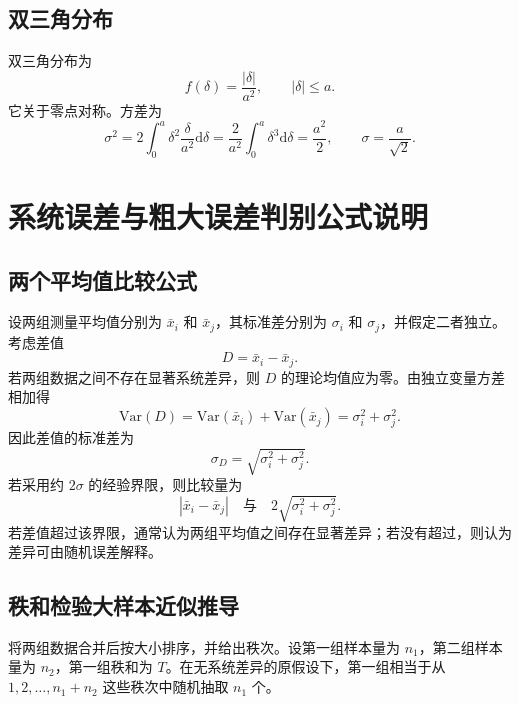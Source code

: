 \documentclass[UTF8,12pt,a4paper]{ctexart}
\newcommand{\dd}{\mathrm{d}}
\newcommand{\Var}{\mathrm{Var}}
\newcommand{\abs}[1]{\left|#1\right|}
\begin{document}
\subsection{双三角分布}
双三角分布为
\begin{equation*}
f(\delta)=\frac{\abs{\delta}}{a^2},\qquad \abs{\delta}\le a .
\end{equation*}
它关于零点对称。方差为
\begin{equation*}
\sigma^2=2\int_{0}^{a}\delta^2\frac{\delta}{a^2}\dd\delta
=\frac{2}{a^2}\int_{0}^{a}\delta^3\dd\delta
=\frac{a^2}{2},\qquad
\sigma=\frac{a}{\sqrt{2}} .
\end{equation*}

\newpage

\section{系统误差与粗大误差判别公式说明}

\subsection{两个平均值比较公式}
设两组测量平均值分别为 $\bar{x}_i$ 和 $\bar{x}_j$，其标准差分别为 $\sigma_i$ 和 $\sigma_j$，并假定二者独立。考虑差值
\begin{equation*}
    D=\bar{x}_i-\bar{x}_j .
\end{equation*}
若两组数据之间不存在显著系统差异，则 $D$ 的理论均值应为零。由独立变量方差相加得
\begin{equation*}
    \Var(D)=\Var(\bar{x}_i)+\Var(\bar{x}_j)=\sigma_i^2+\sigma_j^2 .
\end{equation*}
因此差值的标准差为
\begin{equation*}
    \sigma_D=\sqrt{\sigma_i^2+\sigma_j^2} .
\end{equation*}
若采用约 $2\sigma$ 的经验界限，则比较量为
\begin{equation*}
    \abs{\bar{x}_i-\bar{x}_j}
    \quad \text{与}\quad
    2\sqrt{\sigma_i^2+\sigma_j^2} .
\end{equation*}
若差值超过该界限，通常认为两组平均值之间存在显著差异；若没有超过，则认为差异可由随机误差解释。

\subsection{秩和检验大样本近似推导}
将两组数据合并后按大小排序，并给出秩次。设第一组样本量为 $n_1$，第二组样本量为 $n_2$，第一组秩和为 $T$。在无系统差异的原假设下，第一组相当于从 $1,2,\ldots,n_1+n_2$ 这些秩次中随机抽取 $n_1$ 个。
\end{document}
